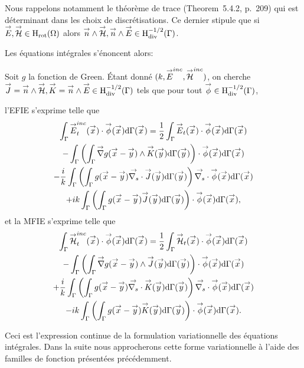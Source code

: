   Nous rappelons notamment le théorème de trace (Theorem~5.4.2, p.~209) qui est déterminant dans les choix de discrétisations. 
  Ce dernier stipule que si \({\overset{\rightarrow}{E}},{\overset{\rightarrow}{\mathcal{H}}} \in \mathrm{H}_\mathrm{rot}{(\Omega)}\) alors \({\overset{\rightarrow}{n}} \wedge {\overset{\rightarrow}{\mathcal{H}}},{\overset{\rightarrow}{n}} \wedge {\overset{\rightarrow}{E}} \in \mathrm{H}_\mathrm{div}^{-1/2}{(\Gamma)}\). 

  Les équations intégrales s'énoncent alors:

  Soit \(g\) la fonction de Green.
  Étant donné \((k,{\overset{\rightarrow}{E}}^{inc},{\overset{\rightarrow}{\mathcal{H}}}^{inc})\), on cherche \({\overset{\rightarrow}{J}} = {\overset{\rightarrow}{n}} \wedge {\overset{\rightarrow}{\mathcal{H}}}, {\overset{\rightarrow}{K}} = {\overset{\rightarrow}{n}} \wedge {\overset{\rightarrow}{E}} \in \mathrm{H}_\mathrm{div}^{-1/2}{(\Gamma)}\)  tels que pour tout \({\overset{\rightarrow}{\phi}} \in \mathrm{H}_\mathrm{div}^{-1/2}(\Gamma)\),

  l'EFIE s'exprime telle que
  \begin{multline}
    \label{eq:form_int:EFIE:var}
    \int_{\Gamma} \vE^{inc}_t(\vx) \cdot \vect{\phi}(\vx) \dd{\Gamma}(\vx) =
      \frac{1}{2} \int_{\Gamma} \vE_t(\vx) \cdot \vect{\phi}(\vx) \dd{\Gamma}(\vx) \\
        - \int_{\Gamma} \left( \int_{\Gamma} \vgrad g(\vx - \vy) \pvect \vK(\vy) \dd{\Gamma}(\vy) \right) \cdot \vect{\phi}(\vx) \dd{\Gamma}(\vx) \\
      - \frac{i}{k} \int_{\Gamma} \left( \int_{\Gamma}  g(\vx - \vy)\vdivs\vJ(\vy) \dd{\Gamma}(\vy) \right)\vdivs \vect{\phi}(\vx) \dd{\Gamma}(\vx) \\
        +  ik\int_{\Gamma} \left( \int_{\Gamma} g(\vx - \vy)\vJ(\vy) \dd{\Gamma}(\vy) \right) \cdot \vect{\phi}(\vx) \dd{\Gamma}(\vx),
  \end{multline}
  et la MFIE s'exprime telle que
  \begin{multline}
    \label{eq:form_int:MFIE:var}
    \int_{\Gamma} \vH^{inc}_t(\vx) \cdot \vect{\phi}(\vx) \dd{\Gamma}(\vx) =
      \frac{1}{2} \int_{\Gamma} \vH_t(\vx) \cdot \vect{\phi}(\vx) \dd{\Gamma}(\vx) \\
        - \int_{\Gamma} \left( \int_{\Gamma} \vgrad g(\vx - \vy) \pvect \vJ(\vy) \dd{\Gamma}(\vy) \right) \cdot \vect{\phi}(\vx) \dd{\Gamma}(\vx) \\
      + \frac{i}{k} \int_{\Gamma} \left( \int_{\Gamma}  g(\vx - \vy)\vdivs\vK(\vy) \dd{\Gamma}(\vy) \right)\vdivs \vect{\phi}(\vx) \dd{\Gamma}(\vx) \\
        -  ik\int_{\Gamma} \left( \int_{\Gamma} g(\vx - \vy)\vK(\vy) \dd{\Gamma}(\vy) \right) \cdot \vect{\phi}(\vx) \dd{\Gamma}(\vx).
  \end{multline}

  Ceci est l'expression continue de la formulation variationnelle des équations intégrales.
  Dans la suite nous approcherons cette forme variationnelle à l'aide des familles de fonction présentées précédemment.

